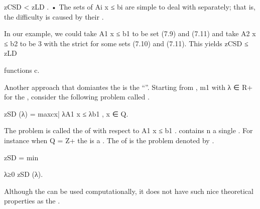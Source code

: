 zCSD < zLD .
• The sets of  Ai x ≤ bi are simple to deal with separately; that is, the difficulty is caused
by their .

In our example, we could take A1 x ≤ b1 to be  set (7.9) and (7.11) and take A2 x ≤ b2 to be
3
with the  strict for some  sets (7.10) and (7.11). This yields zCSD ≤ zLD

functions c.

Another approach that domiantes the  is the ``''. Starting from ,
m1
with  λ ∈ R+
for the , consider the following problem called .

zSD (λ) = max{cx| λA1 x ≤ λb1 , x ∈ Q}.

The problem  is called the  of  with respect to A1 x ≤ b1 .  contains
n
a single . For instance when Q = Z+
the  is a . The  of  is the problem denoted by .

zSD = min

λ≥0 zSD (λ).

Although the  can be used computationally, it does not have such nice theoretical properties as the .

